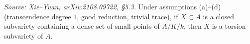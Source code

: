 \begin{theorem}
  \label{thm:mainEssentialCase}
  \textit{Source: Xie--Yuan, arXiv:2108.09722, \S5.3.}
  Under assumptions (a)--(d) (transcendence degree \(1\), good reduction, trivial trace),
  if \(X \subset A\) is a closed subvariety containing a dense set of small points of
  \(A/K/k\), then \(X\) is a torsion subvariety of \(A\).
\end{theorem}

